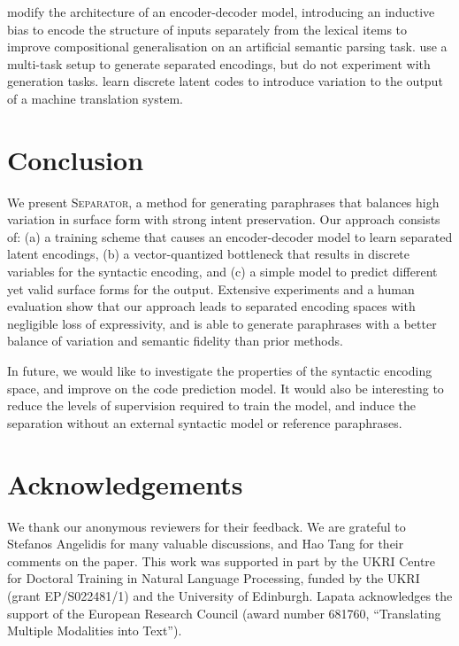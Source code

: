 \documentclass[11pt,a4paper]{article}
\begin{document}
\citet{russin-etal-2020-compositional} modify the architecture of an
encoder-decoder model, introducing an inductive bias to encode the
structure of inputs separately from the lexical items to improve
compositional generalisation on an artificial semantic parsing task. \citet{chen-etal-2019-multi} use a multi-task setup to generate separated encodings, but do not experiment with generation tasks. \citet{shu-etal-2019-generating} learn discrete latent codes to introduce variation to the output of a machine translation system.











\section{Conclusion}

We present \textsc{Separator}, a method for generating paraphrases
that balances high variation in surface form with strong intent
preservation. Our approach consists of: (a) a training scheme that
causes an encoder-decoder model to learn separated latent encodings,
(b) a vector-quantized bottleneck that results in discrete variables
for the syntactic encoding, and (c) a simple model to predict
different yet valid surface forms for the output. Extensive
experiments and a human evaluation show that our approach leads to
separated encoding spaces with negligible loss of expressivity, and is
able to generate paraphrases with a better balance of variation and
semantic fidelity than prior methods.

In future, we would like to investigate the properties of the
syntactic encoding space, and improve on the code prediction model. It
would also be interesting to reduce the levels of supervision required
to train the model, and induce the separation without an external
syntactic  model or reference paraphrases. 

\section*{Acknowledgements}

We thank our anonymous reviewers for their feedback. We are grateful
to Stefanos Angelidis for many valuable discussions, and Hao Tang for
their comments on the paper. This work was supported in part by the
UKRI Centre for Doctoral Training in Natural Language Processing,
funded by the UKRI (grant EP/S022481/1) and the University of
Edinburgh. Lapata acknowledges the support of the European Research
Council (award number 681760, ``Translating Multiple Modalities into
Text'').
\end{document}
